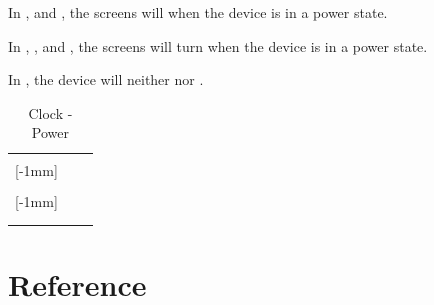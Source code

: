 In ,  and , the screens will  when the device
is in a  power state.

\par\medskip

In , ,  and , the screens will turn 
when the device is in a  power state.

\par\medskip

In , the device will neither  nor .

\begin{table}[H]
  \begin{tabu}{ X[1,c,m] | X[1,c,m] | X[1,c,m] }
  \thrule
   &  &  \\ \mrule

  [-1mm]{} 
    &    &  \\ 
  &   &  \\ \mrule

  [-1mm]{} 
    &    \newline {}
    &  \\ 
  &  &  \\

  \bhrule
  \end{tabu}
\caption {Clock - Power}
\end{table}

\section{Reference} \label{Clock - Reference}

